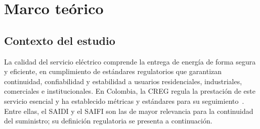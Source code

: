 \label{sec:marco-referencia}


\section{Marco teórico}
\label{sec:Marco-teorico}


\subsection{Contexto del estudio}
    La calidad del servicio eléctrico comprende la entrega de energía de forma segura y eficiente, en cumplimiento de estándares regulatorios que garantizan continuidad, confiabilidad y estabilidad a usuarios residenciales, industriales, comerciales e institucionales. En Colombia, la CREG regula la prestación de este servicio esencial y ha establecido métricas y estándares para su seguimiento~\cite{ref1}. Entre ellas, el SAIDI y el SAIFI son las de mayor relevancia para la continuidad del suministro; su definición regulatoria se presenta a continuación.

